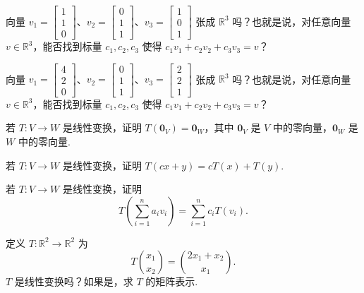 \begin{question}\label{q:1-28}
向量 $v_1=\begin{bmatrix}1\\1\\0\end{bmatrix}$、$v_2=\begin{bmatrix}0\\1\\1\end{bmatrix}$、$v_3=\begin{bmatrix}1\\0\\1\end{bmatrix}$ 张成 $\mathbb{R}^3$ 吗？也就是说，对任意向量 $v\in\mathbb{R}^3$，能否找到标量 $c_1,c_2,c_3$ 使得 $c_1v_1+c_2v_2+c_3v_3=v$？
\end{question}

\begin{question}\label{q:1-29}
向量 $v_1=\begin{bmatrix}4\\2\\0\end{bmatrix}$、$v_2=\begin{bmatrix}0\\1\\1\end{bmatrix}$、$v_3=\begin{bmatrix}2\\2\\1\end{bmatrix}$ 张成 $\mathbb{R}^3$ 吗？也就是说，对任意向量 $v\in\mathbb{R}^3$，能否找到标量 $c_1,c_2,c_3$ 使得 $c_1v_1+c_2v_2+c_3v_3=v$？
\end{question}

\begin{question}\label{q:1-30}
若 $T:V\to W$ 是线性变换，证明 $T(\mathbf{0}_V)=\mathbf{0}_W$，其中 $\mathbf{0}_V$ 是 $V$ 中的零向量，$\mathbf{0}_W$ 是 $W$ 中的零向量.
\end{question}

\begin{question}\label{q:1-31}
若 $T:V\to W$ 是线性变换，证明 $T(cx+y)=cT(x)+T(y)$.
\end{question}

\begin{question}\label{q:1-32}
若 $T:V\to W$ 是线性变换，证明
\[
T\left(\sum_{i=1}^{n}a_iv_i\right)=\sum_{i=1}^{n}c_iT(v_i).
\]
\end{question}

\begin{question}\label{q:1-33}
定义 $T:\mathbb{R}^2\to\mathbb{R}^2$ 为
\[
T\binom{x_1}{x_2}=\binom{2x_1+x_2}{x_1}.
\]
$T$ 是线性变换吗？如果是，求 $T$ 的矩阵表示.
\end{question}

